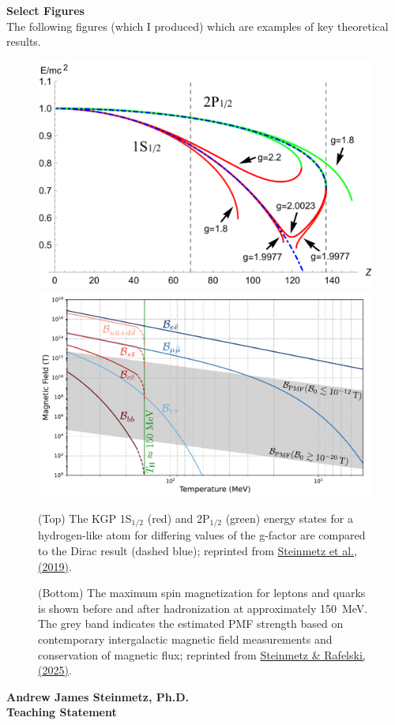 \documentclass[11pt]{article}
\begin{document}
{\large\textbf{Select Figures}}\\
The following figures (which I produced) which are examples of key theoretical results.
\begin{figure}[h!]
    \centering
        \includegraphics[width=0.74\linewidth]{Figure_1.pdf}\\
        \includegraphics[width=0.80\linewidth]{Figure_2.pdf}
    \caption{(Top) The KGP 1S\(_{1/2}\) (red) and 2P\(_{1/2}\) (green) energy states for a hydrogen-like atom for differing values of the g-factor are compared to the Dirac result (dashed blue); reprinted from \href{https://doi.org/10.1140/epja/i2019-12715-5}{Steinmetz et al., (2019)}.}
    \label{fig:figure1}
    \caption{(Bottom) The maximum spin magnetization for leptons and quarks is shown before and after hadronization at approximately 150~MeV. The grey band indicates the estimated PMF strength based on contemporary intergalactic magnetic field measurements and conservation of magnetic flux; reprinted from \href{https://doi.org/10.48550/arXiv.2502.05052}{Steinmetz \& Rafelski, (2025)}.}
    \label{fig:figure2}
\end{figure}

\newpage

\begin{center}
    {\Large\textbf{Andrew James Steinmetz, Ph.D.}}\\[0.5em]
    {\large\textbf{Teaching Statement}}
\end{center}
\end{document}
